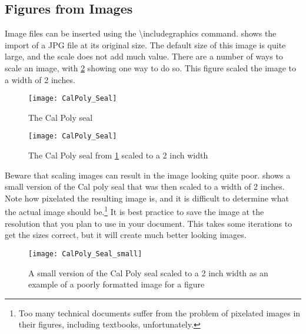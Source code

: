 \subsection{Figures from Images} \label{sec:FiguresFromImages}
    Image files can be inserted using the \textbackslash includegraphics command.
     shows the import of a JPG file at its original size.
    The default size of this image is quite large, and the scale does not add much value.
    There are a number of ways to scale an image, with \cref{fig:CalPolySeal_small} showing one way to do so.
    This figure scaled the image to a width of 2 inches.
    \begin{figure}
        \centering
        \texttt{[image: CalPoly\_Seal]}
        \captionsetup{width=4in}
        \caption{The Cal Poly seal}
        \label{fig:CalPolySeal1}
    \end{figure}
    \begin{figure}
        \centering
        \texttt{[image: CalPoly\_Seal]}
        \captionsetup{width=2in}
        \caption{The Cal Poly seal from \cref{fig:CalPolySeal1} scaled to a 2 inch width}
        \label{fig:CalPolySeal_small}
    \end{figure}

    Beware that scaling images can result in the image looking quite poor.
     shows a small version of the Cal poly seal that was then scaled to a width of 2 inches.
    Note how pixelated the resulting image is, and it is difficult to determine what the actual image should be.\footnote{Too many technical documents suffer from the problem of pixelated images in their figures, including textbooks, unfortunately.}
    It is best practice to save the image at the resolution that you plan to use in your document.
    This takes some iterations to get the sizes correct, but it will create much better looking images.
    \begin{figure}
        \centering
        \texttt{[image: CalPoly\_Seal\_small]}
        \captionsetup{width=2in}
        \caption{A small version of the Cal Poly seal scaled to a 2 inch width as an example of a poorly formatted image for a figure}
        \label{fig:CalPolySeal_scaled}
    \end{figure}


